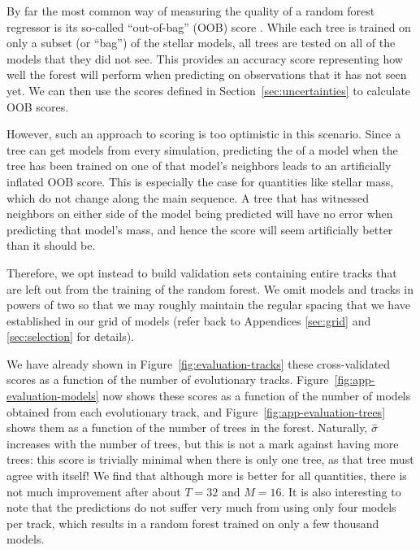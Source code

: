 By far the most common way of measuring the quality of a random forest regressor is its so-called ``out-of-bag'' (OOB) score \citep[see e.g.\ Section~3.1 of][]{breiman2001random}. While each tree is trained on only a subset (or ``bag'') of the stellar models, all trees are tested on all of the models that they did not see. This provides an accuracy score representing how well the forest will perform when predicting on observations that it has not seen yet. We can then use the scores defined in Section~\ref{sec:uncertainties} to calculate OOB scores. 

However, such an approach to scoring is too optimistic in this scenario. Since a tree can get models from every simulation, predicting the  of a model when the tree has been trained on one of that model's neighbors leads to an artificially inflated OOB score. This is especially the case for quantities like stellar mass, which do not change along the main sequence. A tree that has witnessed neighbors on either side of the model being predicted will have no error when predicting that model's mass, and hence the score will seem artificially better than it should be. 

Therefore, we opt instead to build validation sets containing entire tracks that are left out from the training of the random forest. We omit models and tracks in powers of two so that we may roughly maintain the regular spacing that we have established in our grid of models (refer back to Appendices \ref{sec:grid} and \ref{sec:selection} for details). 

We have already shown in Figure~\ref{fig:evaluation-tracks} these cross-validated scores as a function of the number of evolutionary tracks. Figure~\ref{fig:app-evaluation-models} now shows these scores as a function of the number of models obtained from each evolutionary track, and Figure~\ref{fig:app-evaluation-trees} shows them as a function of the number of trees in the forest. Naturally, $\hat\sigma$ increases with the number of trees, but this is not a mark against having more trees: this score is trivially minimal when there is only one tree, as that tree must agree with itself! We find that although more is better for all quantities,  there is not much improvement after about ${T=32}$ and ${M=16}$. It is also interesting to note that the predictions do not suffer very much from using only four models per track, which results in a random forest trained on only a few thousand models. 

